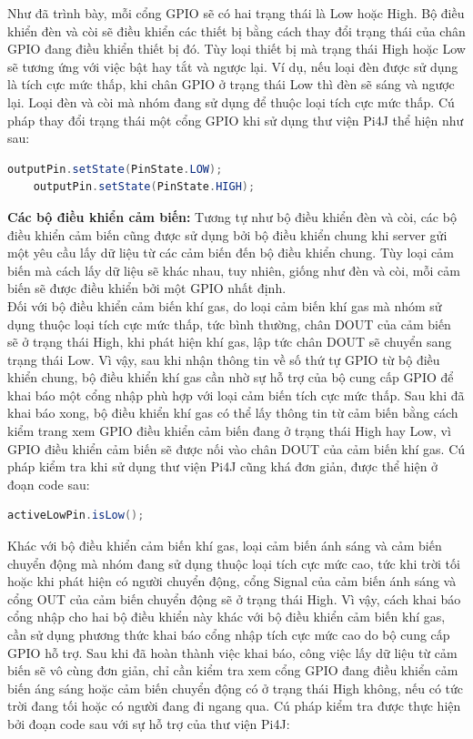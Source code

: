 \documentclass[12pt,a4paper,oneside]{extbook}
\begin{document}
\noindent
Như đã trình bày, mỗi cổng GPIO sẽ có hai trạng thái là Low hoặc High. Bộ điều khiển đèn và còi sẽ điều khiển các thiết bị bằng cách thay đổi trạng thái của chân GPIO đang điều khiển thiết bị đó. Tùy loại thiết bị mà trạng thái High hoặc Low sẽ tương ứng với việc bật hay tắt và ngược lại. Ví dụ, nếu loại đèn được sử dụng là tích cực mức thấp, khi chân GPIO ở trạng thái Low thì đèn sẽ sáng và ngược lại. Loại đèn và còi mà nhóm đang sử dụng để thuộc loại tích cực mức thấp. Cú pháp thay đổi trạng thái một cổng GPIO khi sử dụng thư viện Pi4J thể hiện như sau:

\begin{lstlisting}[language=Java, label={lst:change-state-gpio}]
	outputPin.setState(PinState.LOW);
	outputPin.setState(PinState.HIGH);
\end{lstlisting}

\noindent
\textbf{Các bộ điều khiển cảm biến:} Tương tự như bộ điều khiển đèn và còi, các bộ điều khiển cảm biến cũng được sử dụng bởi bộ điều khiển chung khi server gửi một yêu cầu lấy dữ liệu từ các cảm biến đến bộ điều khiển chung. Tùy loại cảm biến mà cách lấy dữ liệu sẽ khác nhau, tuy nhiên, giống như đèn và còi, mỗi cảm biến sẽ được điều khiển bởi một GPIO nhất định.\\

\noindent
Đối với bộ điều khiển cảm biến khí gas, do loại cảm biến khí gas mà nhóm sử dụng thuộc loại tích cực mức thấp, tức bình thường, chân DOUT của cảm biến sẽ ở trạng thái High, khi phát hiện khí gas, lập tức chân DOUT sẽ chuyển sang trạng thái Low. Vì vậy, sau khi nhận thông tin về số thứ tự GPIO từ bộ điều khiển chung, bộ điều khiển khí gas cần nhờ sự hỗ trợ của bộ cung cấp GPIO để khai báo một cổng nhập phù hợp với loại cảm biến tích cực mức thấp. Sau khi đã khai báo xong, bộ điều khiển khí gas có thể lấy thông tin từ cảm biến bằng cách kiểm trang xem GPIO điều khiển cảm biến đang ở trạng thái High hay Low, vì GPIO điều khiển cảm biến sẽ được nối vào chân DOUT của cảm biến khí gas. Cú pháp kiểm tra khi sử dụng thư viện Pi4J cũng khá đơn giản, được thể hiện ở đoạn code sau:

\begin{lstlisting}[language=Java, label={lst:check-state-active-low}]
	activeLowPin.isLow();
\end{lstlisting}

\noindent
Khác với bộ điều khiển cảm biến khí gas, loại cảm biến ánh sáng và cảm biến chuyển động mà nhóm đang sử dụng thuộc loại tích cực mức cao, tức khi trời tối hoặc khi phát hiện có người chuyển động, cổng Signal của cảm biến ánh sáng và cổng OUT của cảm biến chuyển động sẽ ở trạng thái High. Vì vậy, cách khai báo cổng nhập cho hai bộ điều khiển này khác với bộ điều khiển cảm biến khí gas, cần sử dụng phương thức khai báo cổng nhập tích cực mức cao do bộ cung cấp GPIO hỗ trợ. Sau khi đã hoàn thành việc khai báo, công việc lấy dữ liệu từ cảm biến sẽ vô cùng đơn giản, chỉ cần kiểm tra xem cổng GPIO đang điều khiển cảm biến áng sáng hoặc cảm biến chuyển động có ở trạng thái High không, nếu có tức trời đang tối hoặc có người đang đi ngang qua. Cú pháp kiểm tra được thực hiện bởi đoạn code sau với sự hỗ trợ của thư viện Pi4J:
\end{document}
